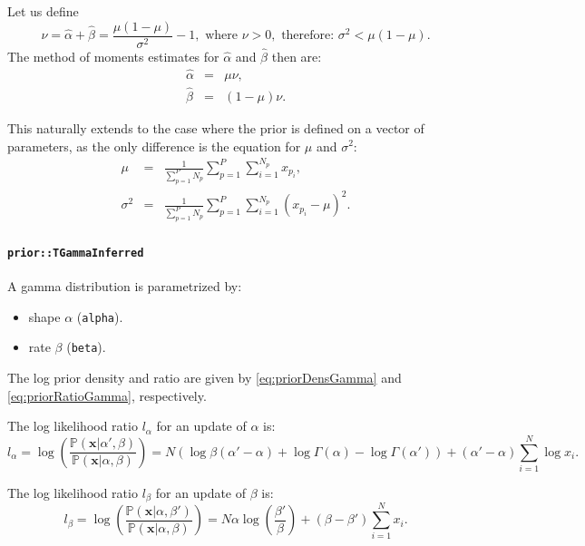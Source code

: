 \documentclass[a4paper,11pt]{article}
\def\p{\mathbb{P}}
\newcommand{\class}[1]{\texttt{#1}}
\newcommand{\privparam}[1]{\texttt{\textunderscore #1}}
\begin{document}
Let us define
\begin{equation*}
 \nu = \hat \alpha + \hat \beta = \frac{\mu(1-\mu)}{\sigma^2} -1, \text{ where } \nu > 0,\text{ therefore: } \sigma^2 < \mu(1-\mu).
\end{equation*}
The method of moments estimates for $\hat\alpha$ and $\hat\beta$ then are:
\begin{eqnarray*}
\hat \alpha &=& \mu \nu, \\
\hat \beta &=& (1 - \mu) \nu.
\end{eqnarray*}

This naturally extends to the case where the prior is defined on a vector of parameters, as the only difference is the equation for $\mu$ and $\sigma^2$:
\begin{eqnarray*}
 \mu &=& \frac{1}{\sum_{p=1}^P N_p} \sum_{p=1}^P \sum_{i=1}^{N_p} x_{p_i}, \\
 \sigma^2 &=& \frac{1}{\sum_{p=1}^P N_p} \sum_{p=1}^P \sum_{i=1}^{N_p} (x_{p_i} - \mu)^2.
\end{eqnarray*}


\paragraph{\class{prior::TGammaInferred}}
A gamma distribution is parametrized by:
\begin{itemize}
 \item shape $\alpha$ (\privparam{alpha}).
 \item rate $\beta$ (\privparam{beta}).
\end{itemize}

The log prior density and ratio are given by \eqref{eq:priorDensGamma} and \eqref{eq:priorRatioGamma}, respectively.

The log likelihood ratio $l_\alpha$ for an update of $\alpha$ is:
\begin{equation*}
 l_\alpha = \log \left(\frac{\p(\boldsymbol x | \alpha', \beta)}{\p(\boldsymbol x | \alpha, \beta)} \right) = N \left(\log \beta(\alpha' - \alpha) + \log \Gamma(\alpha) - \log \Gamma(\alpha')\right) + (\alpha'-\alpha) \sum_{i=1}^{N} \log x_i.
\end{equation*}

The log likelihood ratio $l_\beta$ for an update of $\beta$ is:
\begin{equation*}
 l_\beta = \log \left(\frac{\p(\boldsymbol x | \alpha, \beta')}{\p(\boldsymbol x | \alpha, \beta)} \right) = N \alpha \log \left( \frac{\beta'}{\beta} \right) + (\beta - \beta') \sum_{i=1}^{N} x_i.
\end{equation*}
\end{document}
